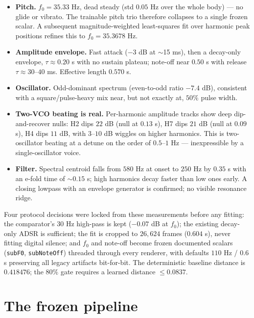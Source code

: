 \documentclass[10pt]{article}
\newcommand{\code}[1]{\texttt{#1}}
\begin{document}
\begin{itemize}
  \item \textbf{Pitch.} $f_0 = 35.33$ Hz, dead steady (std $0.05$ Hz over the whole body) --- no glide or vibrato. The trainable pitch trio therefore collapses to a single frozen scalar. A subsequent magnitude-weighted least-squares fit over harmonic peak positions refines this to $f_0 = 35.3678$ Hz.
  \item \textbf{Amplitude envelope.} Fast attack ($-3$ dB at $\sim$15 ms), then a decay-only envelope, $\tau \approx 0.20$ s with no sustain plateau; note-off near $0.50$ s with release $\tau \approx 30$--$40$ ms. Effective length $0.570$ s.
  \item \textbf{Oscillator.} Odd-dominant spectrum (even-to-odd ratio $-7.4$ dB), consistent with a square/pulse-heavy mix near, but not exactly at, $50\%$ pulse width.
  \item \textbf{Two-VCO beating is real.} Per-harmonic amplitude tracks show deep dip-and-recover nulls: H2 dips $22$ dB (null at $0.13$ s), H7 dips $21$ dB (null at $0.09$ s), H4 dips $11$ dB, with $3$--$10$ dB wiggles on higher harmonics. This is two-oscillator beating at a detune on the order of $0.5$--$1$ Hz --- inexpressible by a single-oscillator voice.
  \item \textbf{Filter.} Spectral centroid falls from $580$ Hz at onset to $250$ Hz by $0.35$ s with an e-fold time of $\sim$$0.15$ s; high harmonics decay faster than low ones early. A closing lowpass with an envelope generator is confirmed; no visible resonance ridge.
\end{itemize}

Four protocol decisions were locked from these measurements before any fitting: the comparator's $30$ Hz high-pass is kept ($-0.07$ dB at $f_0$); the existing decay-only ADSR is sufficient; the fit is cropped to $26{,}624$ frames ($0.604$ s), never fitting digital silence; and $f_0$ and note-off become frozen documented scalars (\code{subF0}, \code{subNoteOff}) threaded through every renderer, with defaults $110$ Hz / $0.6$ s preserving all legacy artifacts bit-for-bit. The deterministic baseline distance is $0.418476$; the $80\%$ gate requires a learned distance $\le 0.0837$.

\section{The frozen pipeline}
\end{document}
